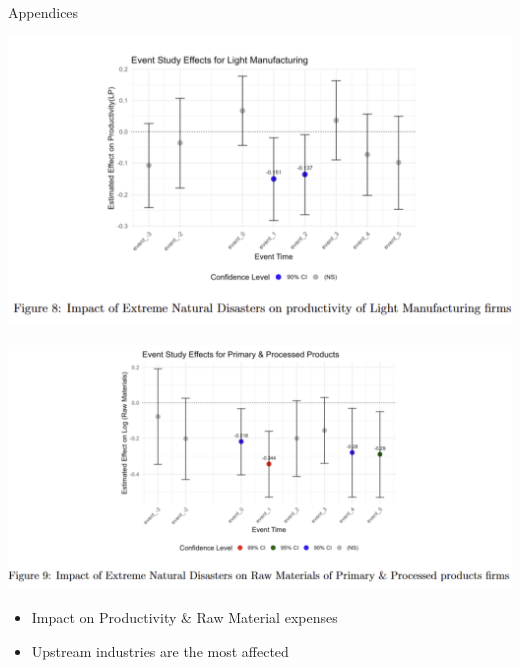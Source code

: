 \documentclass[
  xcolor=svgnames,
  bookmarks=true,
  bookmarksopen=true,
  pdfborder={0 0 0},
  pdfhighlight={/N},
  linkbordercolor={rgb}{0.5,0.5,0.5},
  implicit=false,
  colorlinks=true,
  allcolors=deepblue
]{beamer}
\begin{document}
\begin{frame}{Appendices}
\vspace{-1.5cm}
\centering
\begin{minipage}{0.55\textwidth}
    \centering
    \includegraphics[width=\linewidth]{Results productivity.png}
\end{minipage}
\hfill
\begin{minipage}{0.60\textwidth}
    \centering
    \includegraphics[width=\linewidth]{Results RawM exp.png}
\end{minipage}
\begin{itemize}
\scriptsize
    \item Impact on Productivity \& Raw Material expenses
    \item Upstream industries are the most affected 
\end{itemize}
\end{frame}




\end{document}

